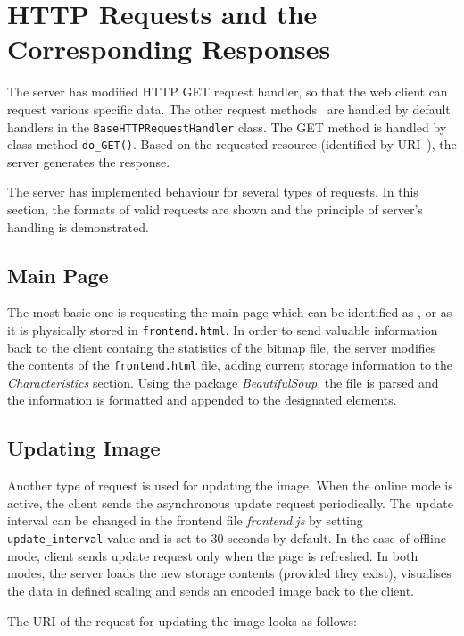 \section{HTTP Requests and the Corresponding Responses}\label{sec:requests}
The server has modified HTTP GET request handler, so that the web client can request various specific data.
The other request methods~\cite{request_methods} are handled by default handlers in the \texttt{BaseHTTPRequestHandler} class.
The GET method is handled by class method \texttt{do\_GET()}. Based on the requested resource (identified
by URI~\cite{uri}), the server generates the response.

The server has implemented behaviour for several types of requests.
In this section, the formats of valid requests are shown and the principle of server's handling is demonstrated.

\subsection{Main Page}
The most basic one is requesting the main page which can be identified as \quotes{\textit{/}},
 or  as it is physically stored in \texttt{frontend.html}.
In order to send valuable information back to the client containg the statistics of the bitmap file, the server modifies
the contents of the \texttt{frontend.html} file, adding current storage information to the \textit{Characteristics} section.
Using the package \textit{BeautifulSoup}, the file is parsed and the information is formatted and appended to the designated elements.

\subsection{Updating Image}
Another type of request is used for updating the image. When the online mode is
active, the client sends the asynchronous update request periodically. The update interval can be changed in the frontend file
\textit{frontend.js} by setting \texttt{update\_interval} value and is set to 30 seconds by default. In the case
of offline mode, client sends update request only when the page is refreshed. In both modes, the server loads the
new storage contents (provided they exist), visualises the data in defined scaling and sends an encoded image back to the client.

The URI of the request for updating the image looks as follows:


